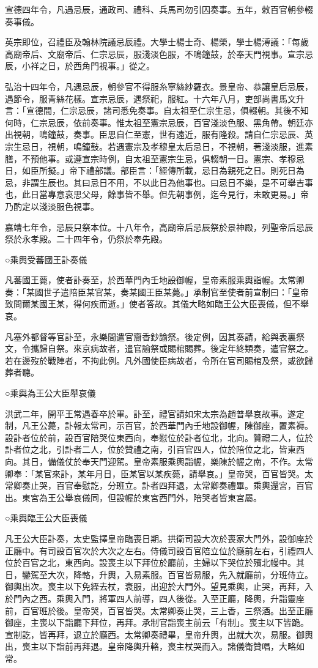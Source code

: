 宣德四年令，凡遇忌辰，通政司、禮科、兵馬司勿引囚奏事。五年，敕百官朝參輟奏事儀。

英宗即位，召禮臣及翰林院議忌辰禮。大學士楊士奇、楊榮，學士楊溥議：「每歲高廟帝后、文廟帝后、仁宗忌辰，服淺淡色服，不鳴鐘鼓，於奉天門視事。宣宗忌辰，小祥之日，於西角門視事。」從之。

弘治十四年令，凡遇忌辰，朝參官不得服糸寧絲紗羅衣。景皇帝、恭讓皇后忌辰，遇節令，服青絲花樣。宣宗忌辰，遇祭祀，服紅。十六年八月，吏部尚書馬文升言：「宣德間，仁宗忌辰，諸司悉免奏事。自太祖至仁宗生忌，俱輟朝。其後不知何時，仁宗忌辰，依前奏事。惟太祖至憲宗忌辰，百官淺淡色服、黑角帶。朝廷亦出視朝，鳴鐘鼓，奏事。臣思自仁至憲，世有遠近，服有隆殺。請自仁宗忌辰、英宗生忌日，視朝，鳴鐘鼓。若遇憲宗及孝穆皇太后忌日，不視朝，著淺淡服，進素膳，不預他事。或遵宣宗時例，自太祖至憲宗生忌，俱輟朝一日。憲宗、孝穆忌日，如臣所擬。」帝下禮部議。部臣言：「經傳所載，忌日為親死之日。則死日為忌，非謂生辰也。其曰忌日不用，不以此日為他事也。曰忌日不樂，是不可舉吉事也，此日當專意哀思父母，餘事皆不舉。但先朝事例，迄今見行，未敢更易。」帝乃酌定以淺淡服色視事。

嘉靖七年令，忌辰只祭本位。十八年令，高廟帝后忌辰祭於景神殿，列聖帝后忌辰祭於永孝殿。二十四年令，仍祭於奉先殿。

○乘輿受蕃國王訃奏儀

凡蕃國王薨，使者訃奏至，於西華門內壬地設御幄，皇帝素服乘輿詣幄。太常卿奏：「某國世子遣陪臣某官某，奏某國王臣某薨。」承制官至使者前宣制曰：「皇帝致問爾某國王某，得何疾而逝。」使者答故。其儀大略如臨王公大臣喪儀，但不舉哀。

凡塞外都督等官訃至，永樂間遣官齎香鈔諭祭。後定例，因其奏請，給與表裏祭文，令攜歸自祭。來京病故者，遣官諭祭或賜棺賜葬。後定年終類奏，遣官祭之。若在邊歿於戰陣者，不拘此例。凡外國使臣病故者，令所在官司賜棺及祭，或欲歸葬者聽。

○乘輿為王公大臣舉哀儀

洪武二年，開平王常遇春卒於軍。訃至，禮官請如宋太宗為趙普舉哀故事。遂定制，凡王公薨，訃報太常司，示百官，於西華門內壬地設御幄，陳御座，置素褥。設訃者位於前，設百官陪哭位東西向，奉慰位於訃者位北，北向。贊禮二人，位於訃者位之北，引訃者二人，位於贊禮之南，引百官四人，位於陪位之北，皆東西向。其日，備儀仗於奉天門迎駕。皇帝素服乘輿詣幄，樂陳於幄之南，不作。太常卿奉：「某官來訃，某年月日，臣某官以某疾薨，請舉哀。」皇帝哭，百官皆哭。太常卿奏止哭，百官奉慰訖，分班立。訃者四拜退，太常卿奏禮畢。乘輿還宮，百官出。東宮為王公舉哀儀同，但設幄於東宮西門外，陪哭者皆東宮屬。

○乘輿臨王公大臣喪儀

凡王公大臣訃奏，太史監擇皇帝臨喪日期。拱衛司設大次於喪家大門外，設御座於正廳中。有司設百官次於大次之左右。侍儀司設百官陪立位於廳前左右，引禮四人位於百官之北，東西向。設喪主以下拜位於廳前，主婦以下哭位於殯北幔中。其日，鑾駕至大次，降輅，升輿，入易素服。百官皆易服，先入就廳前，分班侍立。御輿出次。喪主以下免絰去杖，衰服，出迎於大門外。望見乘輿，止哭，再拜，入於門內之西。乘輿入門，將軍四人前導，四人後從。入至正廳，降輿，升詣靈座前，百官班於後。皇帝哭，百官皆哭。太常卿奏止哭，三上香，三祭酒。出至正廳御座，主喪以下詣廳下拜位，再拜。承制官詣喪主前云「有制」。喪主以下皆跪。宣制訖，皆再拜，退立於廳西。太常卿奏禮畢，皇帝升輿，出就大次，易服。御輿出，喪主以下詣前再拜退。皇帝降輿升輅，喪主杖哭而入。諸儀衛贊唱，大略如常。

